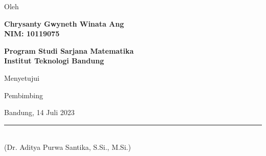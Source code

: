 \clearpage
\pagestyle{empty}

\begin{center}
    \smallskip

    \large \bfseries \MakeUppercase{\thetitle}
    \vfill

    \normalfont Oleh

    \normalfont \textbf{Chrysanty Gwyneth Winata Ang} \\

    \normalfont \textbf{NIM: 10119075} \\
    \vspace{0.75cm}

    \normalfont \textbf{Program Studi Sarjana Matematika} \\
    \normalfont \textbf{Institut Teknologi Bandung}

    \vfill

    \normalfont Menyetujui \\
    \vspace{0.75cm}

    \normalfont Pembimbing \\
    \vspace{0.75cm}

    Bandung, 14 Juli 2023 \\

    \vfill
    \rule{7cm}{0.15mm}\\
    (Dr. Aditya Purwa Santika, S.Si., M.Si.)

\end{center}
\clearpage
